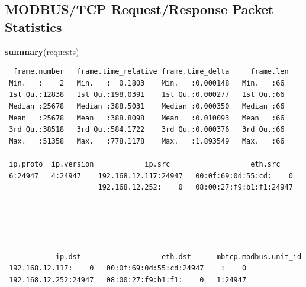 \documentclass[12pt,]{article}
\newenvironment{Shaded}{\begin{snugshade}}{\end{snugshade}}
\newcommand{\KeywordTok}[1]{\textcolor[rgb]{0.13,0.29,0.53}{\textbf{{#1}}}}
\newcommand{\NormalTok}[1]{{#1}}
\begin{document}
\subsection*{MODBUS/TCP Request/Response Packet
Statistics}\label{modbustcp-requestresponse-packet-statistics}

\begin{Shaded}
\begin{Highlighting}[]
\KeywordTok{summary}\NormalTok{(requests)}
\end{Highlighting}
\end{Shaded}

\begin{verbatim}
  frame.number   frame.time_relative frame.time_delta     frame.len 
 Min.   :    2   Min.   :  0.1803    Min.   :0.000148   Min.   :66  
 1st Qu.:12838   1st Qu.:198.0391    1st Qu.:0.000277   1st Qu.:66  
 Median :25678   Median :388.5031    Median :0.000350   Median :66  
 Mean   :25678   Mean   :388.8098    Mean   :0.010093   Mean   :66  
 3rd Qu.:38518   3rd Qu.:584.1722    3rd Qu.:0.000376   3rd Qu.:66  
 Max.   :51358   Max.   :778.1178    Max.   :1.893549   Max.   :66  
                                                                    
 ip.proto  ip.version            ip.src                   eth.src     
 6:24947   4:24947    192.168.12.117:24947   00:0f:69:0d:55:cd:    0  
                      192.168.12.252:    0   08:00:27:f9:b1:f1:24947  
                                                                      
                                                                      
                                                                      
                                                                      
                                                                      
            ip.dst                   eth.dst      mbtcp.modbus.unit_id
 192.168.12.117:    0   00:0f:69:0d:55:cd:24947    :    0             
 192.168.12.252:24947   08:00:27:f9:b1:f1:    0   1:24947             
                                                                      
                                                                      
                                                                      
                                                                      
                                                                      

\end{verbatim}
\end{document}
